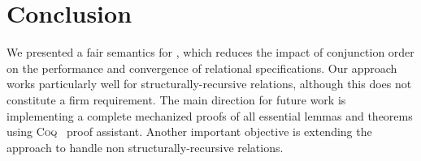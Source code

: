 \section{Conclusion}
\label{sec:conclusion}

We presented a fair semantics for \mk, which reduces the impact of conjunction order on the performance and convergence of relational specifications. Our approach
works particularly well for structurally-recursive relations, although this does not constitute a firm requirement.
The main direction for future work is implementing a complete mechanized proofs of all essential lemmas and theorems using \textsc{Coq}~\cite{fair:Coq} proof assistant.
Another important objective is extending the approach to handle non structurally-recursive relations.
